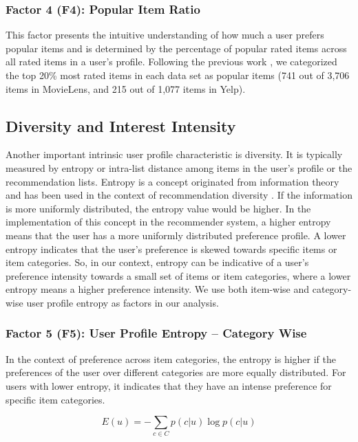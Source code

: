 \subsubsection{Factor 4 (F4): Popular Item Ratio}
This factor presents the intuitive understanding of how much a user prefers popular items and is determined by the percentage of popular rated items across all rated items in a user's profile. Following the previous work \cite{brynjolfsson2006niches,abdollahpouri2017controlling}, we categorized the top 20\% most rated items in each data set as popular items (741 out of 3,706 items in MovieLens, and 215 out of 1,077 items in Yelp). 

\subsection{Diversity and Interest Intensity}
Another important intrinsic user profile characteristic is diversity. It is typically measured by entropy or intra-list distance among items in the user's profile or the recommendation lists. Entropy is a concept originated from information theory \cite{shannon1951prediction} and has been used in the context of recommendation diversity \cite{yin2012challenging}. If the information is more uniformly distributed, the entropy value would be higher. In the implementation of this concept in the recommender system, a higher entropy means that the user has a more uniformly distributed preference profile. A lower entropy indicates that the user's preference is skewed towards specific items or item categories. So, in our context, entropy can be indicative of a user's preference intensity towards a small set of items or item categories, where a lower entropy means a higher preference intensity. We use both item-wise and category-wise user profile entropy as factors in our analysis.

\subsubsection{Factor 5 (F5): User Profile Entropy -- Category Wise}
In the context of preference across item categories, the entropy is higher if the preferences of the user over different categories are more equally distributed. For users with lower entropy, it indicates that they have an intense preference for specific item categories.

\begin{equation} \label{upe_c}
E(u) = -\sum_{c \in C}{p(c|u)\log{p(c|u)}}
\end{equation}

